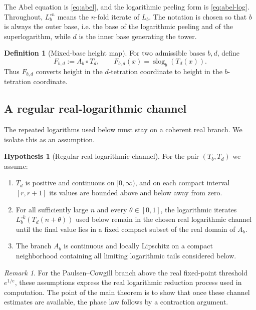 \documentclass[11pt,a4paper]{article}
\theoremstyle{plain}
\theoremstyle{definition}
\newtheorem{definition}[theorem]{Definition}
\newtheorem{hypothesis}[theorem]{Hypothesis}
\theoremstyle{remark}
\newtheorem{remark}[theorem]{Remark}
\newcommand{\slog}{\operatorname{slog}}
\begin{document}
The Abel equation is \eqref{eq:abel}, and the logarithmic peeling form is \eqref{eq:abel-log}.  Throughout, $L_b^{\circ n}$ means the $n$-fold iterate of $L_b$.  The notation is chosen so that $b$ is always the outer base, i.e. the base of the logarithmic peeling and of the superlogarithm, while $d$ is the inner base generating the tower.

\begin{definition}[Mixed-base height map]
For two admissible bases $b,d$, define
\[
  F_{b,d}:=A_b\circ T_d,\qquad F_{b,d}(x)=\slog_b(T_d(x)).
\]
Thus $F_{b,d}$ converts height in the $d$-tetration coordinate to height in the $b$-tetration coordinate.
\end{definition}

\subsection{A regular real-logarithmic channel}

The repeated logarithms used below must stay on a coherent real branch.  We isolate this as an assumption.

\begin{hypothesis}[Regular real-logarithmic channel]\label{hyp:channel}
For the pair $(T_b,T_d)$ we assume:
\begin{enumerate}[label=(R\arabic*),leftmargin=2em]
  \item $T_d$ is positive and continuous on $[0,\infty)$, and on each compact interval $[r,r+1]$ its values are bounded above and below away from zero.
  \item For all sufficiently large $n$ and every $\theta\in[0,1]$, the logarithmic iterates $L_b^{\circ k}(T_d(n+\theta))$ used below remain in the chosen real logarithmic channel until the final value lies in a fixed compact subset of the real domain of $A_b$.
  \item The branch $A_b$ is continuous and locally Lipschitz on a compact neighborhood containing all limiting logarithmic tails considered below.
\end{enumerate}
\end{hypothesis}

\begin{remark}
For the Paulsen--Cowgill branch above the real fixed-point threshold $e^{1/e}$, these assumptions express the real logarithmic reduction process used in computation.  The point of the main theorem is to show that once these channel estimates are available, the phase law follows by a contraction argument.
\end{remark}
\end{document}
